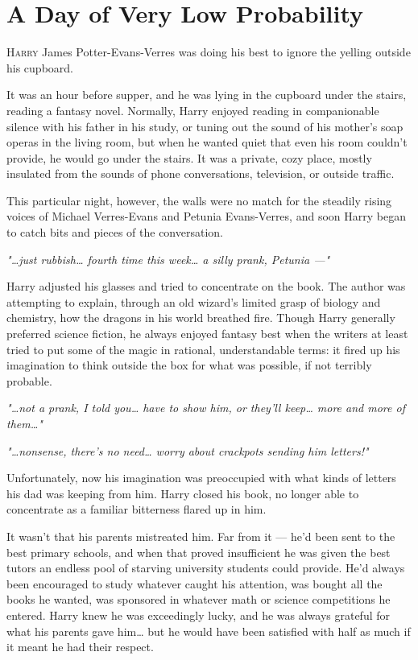 
\chapter{A Day of Very Low Probability}

\lettrine{H}{arry} James Potter-Evans-Verres was doing his best to
ignore the yelling outside his cupboard.

It was an hour before supper, and he was lying in the
cupboard under the stairs, reading a fantasy novel.
Normally, Harry enjoyed reading in companionable silence with
his father in his study, or tuning out the sound of his
mother's soap operas in the living room, but when he
wanted quiet that even his room couldn't provide, he
would go under the stairs. It was a private, cozy place,
mostly insulated from the sounds of phone conversations,
television, or outside traffic.

This particular night, however, the walls were no match for
the steadily rising voices of Michael Verres-Evans and Petunia
Evans-Verres, and soon Harry began to catch bits and
pieces of the conversation.

\emph{"{\ldots}just rubbish{\ldots} fourth time this week{\ldots} a silly prank,
Petunia ---"}

Harry adjusted his glasses and tried to concentrate on the
book. The author was attempting to explain, through an
old wizard's limited grasp of biology and chemistry, how
the dragons in his world breathed fire. Though Harry
generally preferred science fiction, he always enjoyed
fantasy best when the writers at least tried to put some
of the magic in rational, understandable terms: it fired up
his imagination to think outside the box for what was
possible, if not terribly probable.

\emph{"{\ldots}not a prank, I told you{\ldots} have to show him, or they'll
keep{\ldots} more and more of them{\ldots}"}

\emph{"{\ldots}nonsense, there's no need{\ldots} worry about crackpots
sending him letters!"}

Unfortunately, now his imagination was preoccupied with
what kinds of letters his dad was keeping from him. Harry
closed his book, no longer able to concentrate as a familiar
bitterness flared up in him.

It wasn't that his parents mistreated him. Far from it --- he'd
been sent to the best primary schools, and when that
proved insufficient he was given the best tutors an endless
pool of starving university students could provide. He'd
always been encouraged to study whatever caught his
attention, was bought all the books he wanted, was
sponsored in whatever math or science competitions he
entered. Harry knew he was exceedingly lucky, and he was
always grateful for what his parents gave him{\ldots} but he
would have been satisfied with half as much if it meant he
had their respect.

